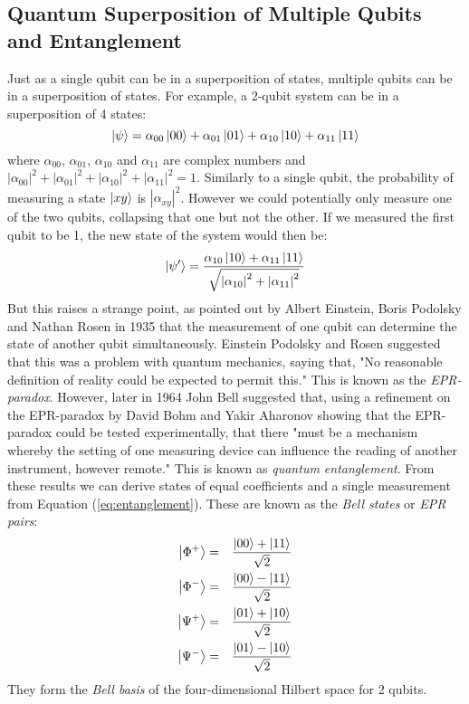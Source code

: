\documentclass[reqno]{amsart}
\numberwithin{equation}{section}
\numberwithin{figure}{section}
\begin{document}
\subsection{Quantum Superposition of Multiple Qubits and Entanglement}
\begin{justify}
    Just as a single qubit can be in a superposition of states, multiple qubits can be in a superposition of states. For example, a 2-qubit system can be in a superposition of 4 states:
    \begin{equation}
        \ket{\psi} = \alpha_{00}\ket{00} + \alpha_{01}\ket{01} + \alpha_{10}\ket{10} + \alpha_{11}\ket{11} \label{eq:entanglement}
    \end{equation}
    where $\alpha_{00}$, $\alpha_{01}$, $\alpha_{10}$ and $\alpha_{11}$ are complex numbers and $|\alpha_{00}|^{2} + |\alpha_{01}|^{2} + |\alpha_{10}|^{2} + |\alpha_{11}|^{2} = 1$. Similarly to a single qubit, the probability of measuring a state $\ket{xy}$ is $|\alpha_{xy}|^{2}$. However we could potentially only measure one of the two qubits, collapsing that one but not the other. If we measured the first qubit to be 1, the new state of the system would then be:
    \begin{equation}
        \ket{\psi'} = \frac{\alpha_{10}\ket{10}+\alpha_{11}\ket{11}}{\sqrt{\abs{\alpha_{10}}^{2} + \abs{\alpha_{11}}^{2}}}
    \end{equation}
    But this raises a strange point, as pointed out by Albert Einstein, Boris Podolsky and Nathan Rosen in 1935 \cite{EinsteinPodolskyRosen1935} that the measurement of one qubit can determine the state of another qubit simultaneously. Einstein Podolsky and Rosen suggested that this was a problem with quantum mechanics, saying that, "No reasonable definition of reality could be expected to permit this." This is known as the \textit{EPR-paradox}. However, later in 1964 John Bell suggested that, using a refinement on the EPR-paradox by David Bohm and Yakir Aharonov \cite{BohmAharonov1957} showing that the EPR-paradox could be tested experimentally, that there "must be a mechanism whereby the setting of one measuring device can influence the reading of another instrument, however remote." \cite{Bell1964} This is known as \textit{quantum entanglement}. From these results we can derive states of equal coefficients and a single measurement from Equation (\ref{eq:entanglement}). These are known as the \textit{Bell states} or \textit{EPR pairs}: 
        \begin{eqnarray}
            \ket{\Phi^{+}} &=& \frac{\ket{00} + \ket{11}}{\sqrt{2}} \label{eqn:bellphi+} \\
            \ket{\Phi^{-}} &=& \frac{\ket{00} - \ket{11}}{\sqrt{2}} \label{eqn:bellphi-} \\
            \ket{\Psi^{+}} &=& \frac{\ket{01} + \ket{10}}{\sqrt{2}} \label{eqn:bellpsi+} \\
            \ket{\Psi^{-}} &=& \frac{\ket{01} - \ket{10}}{\sqrt{2}} \label{eqn:bellpsi-} 
        \end{eqnarray}
They form the \textit{Bell basis} of the four-dimensional Hilbert space for 2 qubits.
\end{justify}
\end{document}
